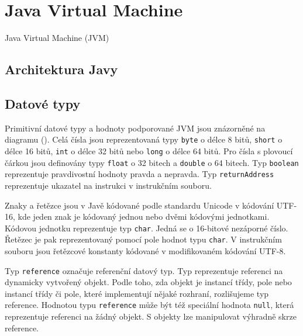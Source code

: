 \chapter{Java Virtual Machine}


Java Virtual Machine (JVM)

\section{Architektura Javy}


\section{Datové typy}


Primitivní datové typy a hodnoty podporované JVM jsou znázorněné na diagramu (). Celá čísla jsou reprezentovaná typy \texttt{byte} o délce 8 bitů, \texttt{short} o délce 16 bitů, \texttt{int} o délce 32 bitů nebo \texttt{long} o délce 64 bitů. Pro čísla s plovoucí čárkou jsou definovány typy \texttt{float} o 32 bitech a \texttt{double} o 64 bitech. Typ \texttt{boolean} reprezentuje pravdivostní hodnoty pravda a nepravda. Typ \texttt{returnAddress} reprezentuje ukazatel na instrukci v instrukčním souboru.

Znaky a řetězce jsou v Javě kódované podle standardu Unicode v kódování UTF-16, kde jeden znak je kódovaný jednou nebo dvěmi kódovými jednotkami. Kódovou jednotku reprezentuje typ \texttt{char}. Jedná se o 16-bitové nezáporné číslo. Řetězec je pak reprezentovaný pomocí pole hodnot typu \texttt{char}. V instrukčním souboru jsou řetězcové konstanty kódované v modifikovaném kódování UTF-8. 

Typ \texttt{reference} označuje referenční datový typ. Typ reprezentuje referenci na dynamicky vytvořený objekt. Podle toho, zda objekt je instancí třídy, pole nebo instancí třídy či pole, které implementují nějaké rozhraní, rozlišujeme typ reference. Hodnotou typu \texttt{reference} může být též speciální hodnota \texttt{null}, která reprezentuje referenci na žádný objekt. S objekty lze manipulovat výhradně skrze reference.


